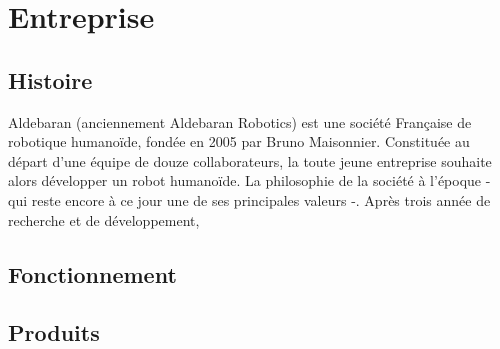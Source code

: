 \chapter*{Entreprise}
\label{Entreprise}
\thispagestyle{fancy}

\section{Histoire}
\label{Entreprise: histoire}
Aldebaran (anciennement Aldebaran Robotics) est une société Française de robotique humanoïde, fondée en 2005 par Bruno Maisonnier. 
Constituée au départ d'une équipe de douze collaborateurs, la toute jeune entreprise souhaite alors développer un robot humanoïde. La philosophie de la société à l'époque - qui reste encore à ce jour une de ses principales valeurs  -. Après trois année de recherche et de développement, 

\section{Fonctionnement}

\section{Produits}